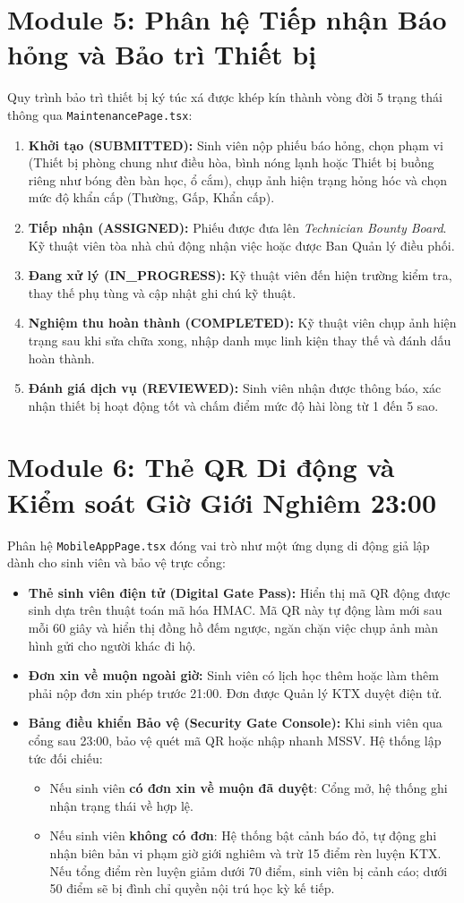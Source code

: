 \section{Module 5: Phân hệ Tiếp nhận Báo hỏng và Bảo trì Thiết bị}
Quy trình bảo trì thiết bị ký túc xá được khép kín thành vòng đời 5 trạng thái thông qua \texttt{MaintenancePage.tsx}:
\begin{enumerate}
    \item \textbf{Khởi tạo (SUBMITTED):} Sinh viên nộp phiếu báo hỏng, chọn phạm vi (Thiết bị phòng chung như điều hòa, bình nóng lạnh hoặc Thiết bị buồng riêng như bóng đèn bàn học, ổ cắm), chụp ảnh hiện trạng hỏng hóc và chọn mức độ khẩn cấp (Thường, Gấp, Khẩn cấp).
    \item \textbf{Tiếp nhận (ASSIGNED):} Phiếu được đưa lên \textit{Technician Bounty Board}. Kỹ thuật viên tòa nhà chủ động nhận việc hoặc được Ban Quản lý điều phối.
    \item \textbf{Đang xử lý (IN\_PROGRESS):} Kỹ thuật viên đến hiện trường kiểm tra, thay thế phụ tùng và cập nhật ghi chú kỹ thuật.
    \item \textbf{Nghiệm thu hoàn thành (COMPLETED):} Kỹ thuật viên chụp ảnh hiện trạng sau khi sửa chữa xong, nhập danh mục linh kiện thay thế và đánh dấu hoàn thành.
    \item \textbf{Đánh giá dịch vụ (REVIEWED):} Sinh viên nhận được thông báo, xác nhận thiết bị hoạt động tốt và chấm điểm mức độ hài lòng từ 1 đến 5 sao.
\end{enumerate}

\section{Module 6: Thẻ QR Di động và Kiểm soát Giờ Giới Nghiêm 23:00}
Phân hệ \texttt{MobileAppPage.tsx} đóng vai trò như một ứng dụng di động giả lập dành cho sinh viên và bảo vệ trực cổng:
\begin{itemize}
    \item \textbf{Thẻ sinh viên điện tử (Digital Gate Pass):} Hiển thị mã QR động được sinh dựa trên thuật toán mã hóa HMAC. Mã QR này tự động làm mới sau mỗi 60 giây và hiển thị đồng hồ đếm ngược, ngăn chặn việc chụp ảnh màn hình gửi cho người khác đi hộ.
    \item \textbf{Đơn xin về muộn ngoài giờ:} Sinh viên có lịch học thêm hoặc làm thêm phải nộp đơn xin phép trước 21:00. Đơn được Quản lý KTX duyệt điện tử.
    \item \textbf{Bảng điều khiển Bảo vệ (Security Gate Console):} Khi sinh viên qua cổng sau 23:00, bảo vệ quét mã QR hoặc nhập nhanh MSSV. Hệ thống lập tức đối chiếu:
    \begin{itemize}
        \item Nếu sinh viên \textbf{có đơn xin về muộn đã duyệt}: Cổng mở, hệ thống ghi nhận trạng thái về hợp lệ.
        \item Nếu sinh viên \textbf{không có đơn}: Hệ thống bật cảnh báo đỏ, tự động ghi nhận biên bản vi phạm giờ giới nghiêm và trừ 15 điểm rèn luyện KTX. Nếu tổng điểm rèn luyện giảm dưới 70 điểm, sinh viên bị cảnh cáo; dưới 50 điểm sẽ bị đình chỉ quyền nội trú học kỳ kế tiếp.
    \end{itemize}
\end{itemize}

